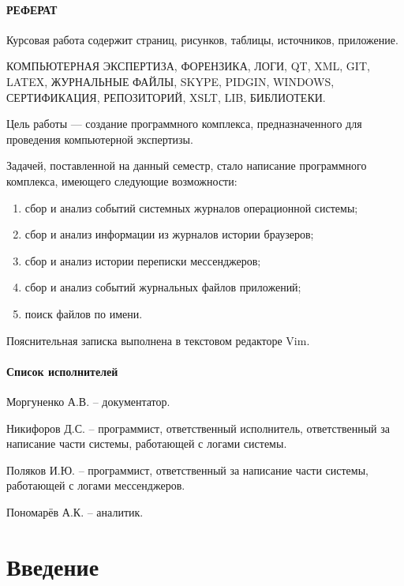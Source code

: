 \documentclass[russian,utf8,14pt,simple]{eskdtext}
\begin{document}
\newpage
{}
\paragraph{\hfill РЕФЕРАТ \hfill}
Курсовая работа содержит  страниц,  рисунков,  таблицы,  источников,  приложение.

КОМПЬЮТЕРНАЯ ЭКСПЕРТИЗА, ФОРЕНЗИКА, ЛОГИ, QT, XML, GIT, LATEX, ЖУРНАЛЬНЫЕ ФАЙЛЫ, SKYPE, PIDGIN, WINDOWS, СЕРТИФИКАЦИЯ, РЕПОЗИТОРИЙ, XSLT, LIB, БИБЛИОТЕКИ.

Цель работы --- создание программного комплекса, предназначенного для проведения компьютерной экспертизы.

Задачей, поставленной на данный семестр, стало написание программного комплекса, имеющего следующие возможности: 
\begin{enumerate}
\item сбор и анализ событий системных журналов операционной системы;
\item сбор и анализ информации из журналов истории браузеров;
\item сбор и анализ истории переписки мессенджеров;
\item сбор и анализ событий журнальных файлов приложений;
\item поиск файлов по имени.
\end{enumerate}


Пояснительная записка выполнена в текстовом редакторе Vim.

\newpage
{}
\paragraph{\hfill Список исполнителей \hfill}
Моргуненко А.В. -- документатор.

Никифоров Д.С. -- программист, ответственный исполнитель, ответственный за написание части системы, работающей с логами системы.

Поляков И.Ю. -- программист, ответственный за написание части системы, работающей с логами мессенджеров.

Пономарёв А.К. -- аналитик.

\newpage
{}
\renewcommand\contentsname{\hfill Содержание \hfill}
\tableofcontents

\newpage
{}
\section{Введение}

\end{document}

